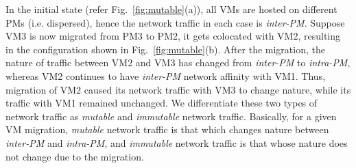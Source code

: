 In the initial state (refer Fig.~\ref{fig:mutable}(a)), all VMs are
hosted on different PMs (i.e. dispersed), hence the network traffic
in each case is \textit{inter-PM}. Suppose VM3 is now migrated from
PM3 to PM2, it gets colocated with VM2, resulting in the 
configuration shown in Fig.~\ref{fig:mutable}(b). 
After the migration, the nature of traffic between VM2 and VM3
has changed from \textit{inter-PM} to \textit{intra-PM}, whereas VM2
continues to have \textit{inter-PM} network affinity with VM1.
Thus, migration of VM2 caused its network traffic with VM3 to 
change nature, while its traffic with VM1 remained unchanged. We differentiate
these two types of network traffic as \textit{mutable} and \textit{immutable}
network traffic.
Basically, for a given VM migration, \textit{mutable} network traffic 
is that which changes nature between \textit{inter-PM} and \textit{intra-PM},
and \textit{immutable} network traffic is that whose nature does not change
due to the migration.

